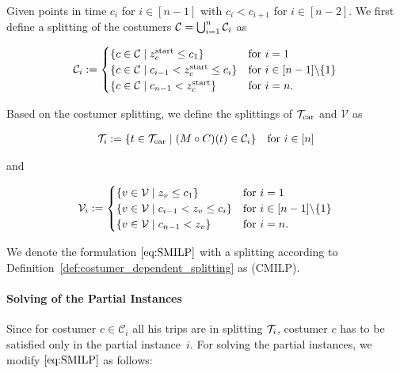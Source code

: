 \begin{definition}
\label{def:costumer_dependent_splitting}

Given points in time $c_i$ for $i\in[n-1]$ with $c_i<c_{i+1}$ for $i\in[n-2]$. We first define a splitting of the costumers $\mathcal{C}=\bigcup_{i=1}^n\mathcal{C}_i$ as

\begin{align*}
	\mathcal{C}_i := \begin{cases}
		\left\{c\in\mathcal{C}\mid z^{\operatorname{start}}_c\leq c_1\right\} & \text{for } i=1 \\
		\left\{c\in\mathcal{C}\mid c_{i-1}<z^{\operatorname{start}}_c\leq c_i\right\} & \text{for } i\in[n-1]\backslash\{1\} \\
		\left\{c\in\mathcal{C}\mid c_{n-1}<z^{\operatorname{start}}_c\right\} & \text{for } i=n.
	\end{cases}
\end{align*}

Based on the costumer splitting, we define the splittings of $\mathcal{T}_{\operatorname{car}}$ and $\mathcal{V}$ as

\begin{align*}
	\mathcal{T}_i := \left\{t\in\mathcal{T}_{\operatorname{car}}\mid (M\circ C)(t)\in\mathcal{C}_i\right\} && \text{for } i\in[n]
\end{align*}

and

\begin{align*}
	\mathcal{V}_i := \begin{cases}
		\left\{v\in\mathcal{V}\mid z_v\leq c_1\right\} & \text{for } i=1 \\
		\left\{v\in\mathcal{V}\mid c_{i-1}<z_v\leq c_i\right\} & \text{for } i\in[n-1]\backslash\{1\} \\
		\left\{v\in\mathcal{V}\mid c_{n-1}<z_v\right\} & \text{for } i=n.
	\end{cases}
\end{align*}

\end{definition}

We denote the formulation $\eqref{eq:SMILP}$ with a splitting according to Definition~\ref{def:costumer_dependent_splitting} as (CMILP).

\paragraph{Solving of the Partial Instances} \parfill

Since for costumer $c\in\mathcal{C}_i$ all his trips are in splitting $\mathcal{T}_i$, costumer $c$ has to be satisfied only in the partial instance~$i$. For solving the partial instances, we modify $\eqref{eq:SMILP}$ as follows:

